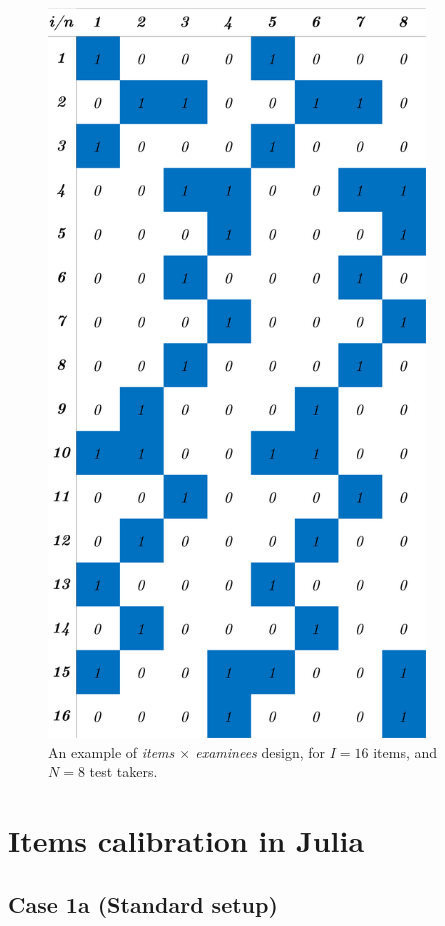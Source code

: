 \begin{figure}[H] 
	\centering
	\includegraphics[width=10cm]{Figures/itemsxexaminees.png}
	\caption{An example of \emph{items $\times$ examinees} design, for $I=16$ items, and $N=8$ test takers.}
	\label{fig:itemsxexaminees}
\end{figure}
\pagebreak

\section{Items calibration in Julia}
\subsection{Case 1a (Standard setup)}

